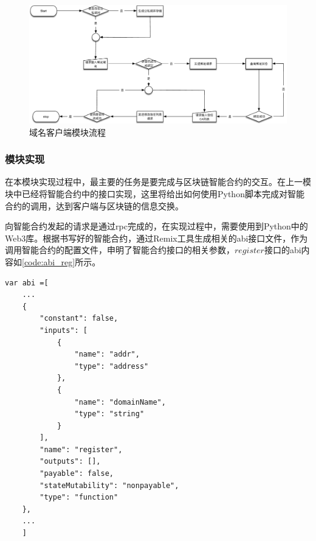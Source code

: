 \begin{figure}[!htbp]
 	\centering
 	\includegraphics[width=1\textwidth]{img/domaincli_work_flow}
 	\caption{域名客户端模块流程}\label{fig:domaincli_work_flow}
\end{figure}


\subsubsection{模块实现}

在本模块实现过程中，最主要的任务是要完成与区块链智能合约的交互。在上一模块中已经将智能合约中的接口实现，这里将给出如何使用Python脚本完成对智能合约的调用，达到客户端与区块链的信息交换。

向智能合约发起的请求是通过rpc完成的，在实现过程中，需要使用到Python中的Web3库。根据书写好的智能合约，通过Remix工具生成相关的abi接口文件，作为调用智能合约的配置文件，申明了智能合约接口的相关参数，$register$接口的abi内容如\ref{code:abi_reg}所示。
\renewcommand{\lstlistingname}{代码}
\begin{lstlisting}[caption={register接口的abi}, label={code:abi_reg}]
	var abi =[
	...
	{
		"constant": false,
		"inputs": [
			{
				"name": "addr",
				"type": "address"
			},
			{
				"name": "domainName",
				"type": "string"
			}
		],
		"name": "register",
		"outputs": [],
		"payable": false,
		"stateMutability": "nonpayable",
		"type": "function"
	},
	...
	]
\end{lstlisting}

